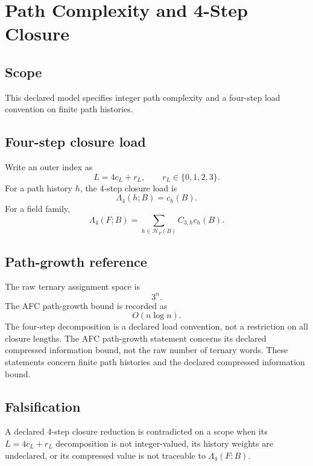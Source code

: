 \section{Path Complexity and 4-Step Closure}
\label{app:path-complexity-quarantine}

\subsection{Scope}\label{app:proto:scope}
This declared model specifies integer path complexity and a four-step load
convention on finite path histories.

\subsection{Four-step closure load}\label{app:proto:statements}
Write an outer index as
\[
L=4c_L+r_L,
\qquad
r_L\in\{0,1,2,3\}.
\]
For a path history \(h\), the 4-step closure load is
\[
\Lambda_4(h;B)=c_h(B).
\]
For a field family,
\begin{equation}
\Lambda_4(F;B)=
\sum_{h\in\mathcal H_F(B)}C_{3,h}c_h(B).
\label{app:proto:eq:four-step-load}
\end{equation}

\subsection{Path-growth reference}\label{app:proto:path-growth}
The raw ternary assignment space is
\[
3^n.
\]
The AFC path-growth bound is recorded as
\[
O(n\log n).
\]
The four-step decomposition is a declared load convention, not a restriction on all closure lengths. The AFC path-growth statement concerns its declared compressed information bound, not the raw number of ternary words. These statements concern finite path histories and the declared compressed information bound.

\subsection{Falsification}\label{app:proto:falsification}
A declared 4-step closure reduction is contradicted on a scope when its \(L=4c_L+r_L\) decomposition is not integer-valued, its history weights are undeclared, or its compressed value is not traceable to \(\Lambda_4(F;B)\).


